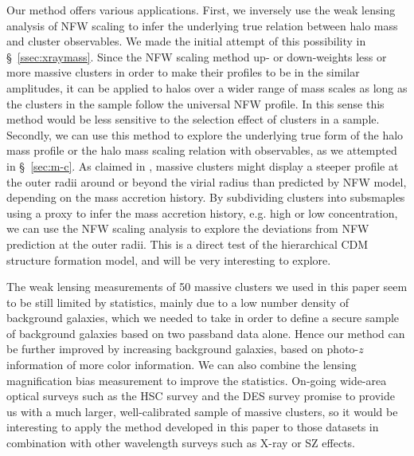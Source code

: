 \documentclass[iop, apj]{emulateapj}
\newcommand{\?}{\stackrel{?}{=}}
\begin{document}
Our method offers various applications. First, we inversely use the weak
lensing analysis of NFW scaling to infer the underlying true relation
between halo mass and cluster observables.
We made the initial attempt
of this possibility in \S~\ref{ssec:xraymass}.
Since the NFW scaling method up- or down-weights less or more massive
clusters in order to make their profiles to be in the similar
amplitudes, it can be applied to halos over a wider range of mass scales
as long as the clusters in the sample follow the universal NFW
profile. In this sense this method would be less sensitive to the
selection effect of clusters in a sample.  Secondly, we can use this
method to explore the underlying true form of the halo mass profile or
the halo mass scaling relation with observables, as we attempted in
\S~\ref{sec:m-c}.  As claimed in \citet{DiemerKravtsov:14b}, massive
clusters might display a steeper profile at the outer radii around or
beyond the virial radius than predicted by NFW model, depending on the
mass accretion history. By subdividing clusters into subsmaples using a
proxy to infer the mass accretion history, e.g. high or low
concentration, we can use the NFW scaling analysis to explore the
deviations from NFW prediction at the outer radii. This is a direct test
of the hierarchical CDM structure formation model, and will be very
interesting to explore.

The weak lensing measurements of 50 massive clusters we used in this
paper seem to be still limited by statistics, mainly due to a low number
density of background galaxies, which we needed to take in order to
define a secure sample of background galaxies based on two passband data
alone. Hence our method can be further improved by increasing background
galaxies, based on photo-$z$ information of more color information. We
can also combine the lensing magnification bias measurement to improve
the statistics. On-going wide-area optical surveys such as the HSC
survey and the DES survey promise to provide us with a much larger,
well-calibrated sample of massive clusters, so it would be interesting
to apply the method developed in this paper to those datasets in
combination with other wavelength surveys such as X-ray or SZ effects.

\end{document}
